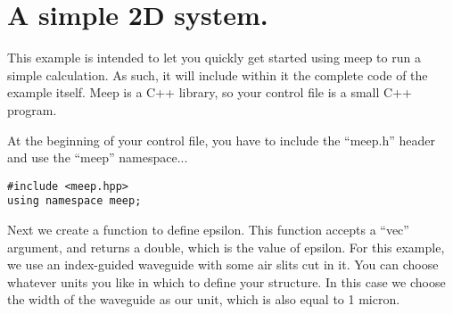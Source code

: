 \begin{comment}
/*
\end{comment}
\section{A simple 2D system.}
\begin{comment}
*/
\end{comment}

This example is intended to let you quickly get started using meep to run
a simple calculation.  As such, it will include within it the complete code
of the example itself.  Meep is a C++ library, so your control file is a
small C++ program.

At the beginning of your control file, you have to include the ``meep.h''
header and use the ``meep'' namespace...
\begin{verbatim}
#include <meep.hpp>
using namespace meep;
\end{verbatim}

Next we create a function to define epsilon.  This function accepts a
``vec'' argument, and returns a double, which is the value of epsilon.  For
this example, we use an index-guided waveguide with some air slits cut in
it.  You can choose whatever units you like in which to define your
structure.  In this case we choose the width of the waveguide as our unit,
which is also equal to 1 micron.

